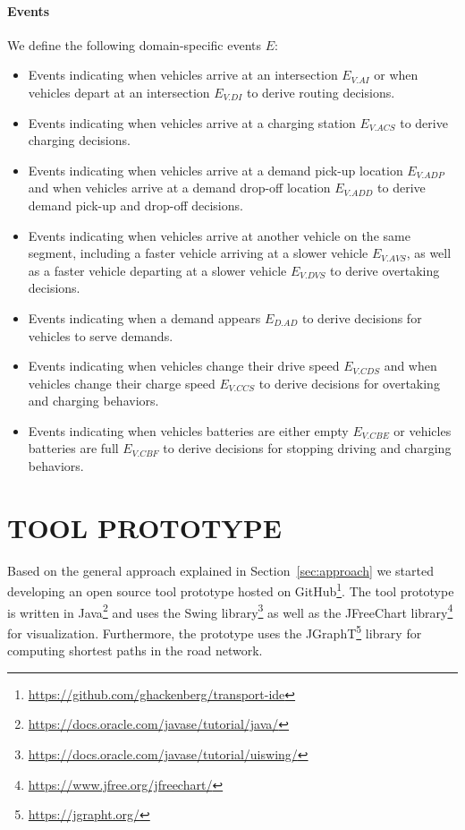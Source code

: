 \documentclass[a4paper,twoside]{article}
\begin{document}
	\paragraph{Events}
	We define the following domain-specific events $E$:
	\begin{itemize}
		\item Events indicating when vehicles arrive at an intersection $E_{V.AI}$ or when vehicles depart at an intersection $E_{V.DI}$ to derive routing decisions. 
		\item Events indicating when vehicles arrive at a charging station $E_{V.ACS}$ to derive charging decisions. 
		\item Events indicating when vehicles arrive at a demand pick-up location $E_{V.ADP}$ and when vehicles arrive at a demand drop-off location $E_{V.ADD}$ to derive demand pick-up and drop-off decisions. 
		\item Events indicating when vehicles arrive at another vehicle on the same segment, including a faster vehicle arriving at a  slower vehicle $E_{V.AVS}$, as well as a faster vehicle departing at a slower vehicle $E_{V.DVS}$ to derive overtaking decisions.
		\item Events indicating when a demand appears $E_{D.AD}$ to derive decisions for vehicles to serve demands.
		\item Events indicating when vehicles change their drive speed $E_{V.CDS}$ and when vehicles change their charge speed $E_{V.CCS}$ to derive decisions for overtaking and charging behaviors. 
		\item Events indicating when vehicles batteries are either empty $E_{V.CBE}$ or vehicles batteries are full $E_{V.CBF}$ to derive decisions for stopping driving and charging behaviors.
	\end{itemize}

	
	\section{\uppercase{Tool prototype}}
	\label{sec:tool-prototype}
	
	Based on the general approach explained in Section~\ref{sec:approach} we started developing an open source tool prototype hosted on GitHub\footnote{\url{https://github.com/ghackenberg/transport-ide}}.
	The tool prototype is written in Java\footnote{\url{https://docs.oracle.com/javase/tutorial/java/}} and uses the Swing library\footnote{\url{https://docs.oracle.com/javase/tutorial/uiswing/}} as well as the JFreeChart library\footnote{\url{https://www.jfree.org/jfreechart/}} for visualization.
	Furthermore, the prototype uses the JGraphT\footnote{\url{https://jgrapht.org/}} library for computing shortest paths in the road network.
	
\end{document}
